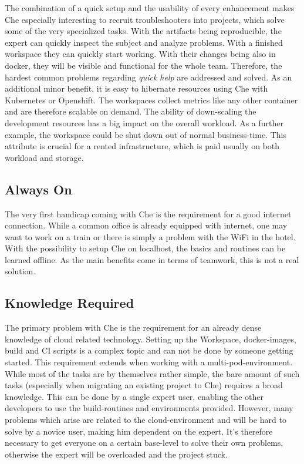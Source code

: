 \documentclass[utf8]{lni}
\begin{document}
The combination of a quick setup and the usability of every enhancement makes Che especially interesting to recruit troubleshooters into projects, which solve some of the very specialized tasks.  
With  the  artifacts  being  reproducible,  the  expert  can quickly inspect the subject and analyze problems.
With a finished workspace they can quickly start working. 
With their changes being also in docker, they will be visible and functional for the whole team.
Therefore,  the  hardest  common  problems  regarding \textit{quick help} are addressed and solved. 
As an additional minor benefit, it is easy to hibernate resources  using  Che  with  Kubernetes  or  Openshift.
The workspaces collect metrics like any other container and are therefore scalable on demand. 
The ability of down-scaling the development resources has a big impact on the overall 
workload. 
As a further example, the workspace could be shut down out of normal business-time. This attribute is crucial for a rented infrastructure, which is paid usually on both workload and storage. 
\subsection{Always On}
The very first handicap coming with Che is the requirement for a good internet connection. 
While a common office is already equipped with internet, one may want to work on a train or there is simply a problem with the WiFi in the hotel.
With the possibility to setup Che on localhost, the basics and routines can be learned offline. As the main benefits come in terms of teamwork, this is not a real solution.
\subsection{Knowledge Required}
The primary problem with Che is the requirement for an already dense knowledge of cloud related technology.
Setting up the Workspace, docker-images, build and CI scripts is a complex topic and can not be done by someone getting started. 
This requirement extends when working with a multi-pod-environment. 
While most of the tasks are by themselves rather simple, the bare amount of such tasks (especially when migrating an existing project to Che) requires a broad knowledge.
This can be done by a single expert user, enabling the other developers  to  use  the  build-routines and  environments provided. 
However, many problems which arise are related to the cloud-environment and will be hard to solve by a novice user, making him dependent on the expert. 
It's therefore necessary to get everyone on a certain base-level to solve their own problems, otherwise the expert will be overloaded and the project stuck.  
\end{document}
